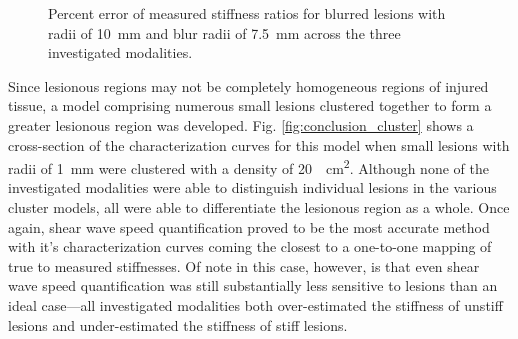 			\begin{figure}[!htb]
				\centering
				\caption[Percent error of measured stiffness ratios for blurred lesions across the three investigated modalities]{Percent error of measured stiffness ratios for blurred lesions with radii of \SI{10}{\mm} and blur radii of \SI{7.5}{\mm} across the three investigated modalities.}
				\label{fig:conclusions_blur_pd}
			\end{figure}

			Since lesionous regions may not be completely homogeneous regions of injured tissue, a model comprising numerous small lesions clustered together to form a greater lesionous region was developed. Fig. \ref{fig:conclusion_cluster} shows a cross-section of the characterization curves for this model when small lesions with radii of \SI{1}{\mm} were clustered with a density of \SI{20}{\per\cm\squared}. Although none of the investigated modalities were able to distinguish individual lesions in the various cluster models, all were able to differentiate the lesionous region as a whole. Once again, shear wave speed quantification proved to be the most accurate method with it's characterization curves coming the closest to a one-to-one mapping of true to measured stiffnesses. Of note in this case, however, is that even shear wave speed quantification was still substantially less sensitive to lesions than an ideal case---all investigated modalities both over-estimated the stiffness of unstiff lesions and under-estimated the stiffness of stiff lesions.

